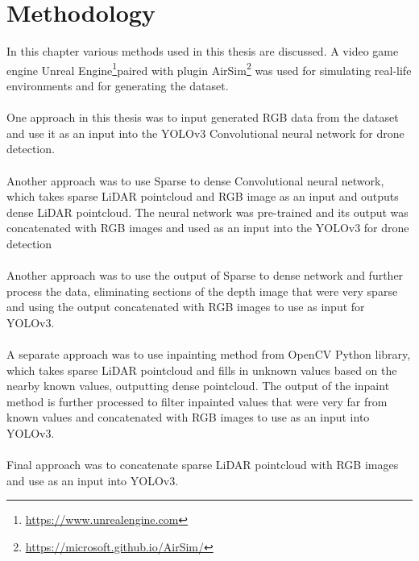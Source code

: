 \documentclass[twoside]{ctuthesis}
\theoremstyle{plain}
\theoremstyle{definition}
\theoremstyle{note}
\begin{document}
\chapter{Methodology}
In this chapter various methods used in this thesis are discussed. A video game engine Unreal Engine\footnote{\url{https://www.unrealengine.com}}paired with plugin AirSim\footnote{\url{https://microsoft.github.io/AirSim/}} was used for simulating real-life environments and for generating the dataset.\\
\\
One approach in this thesis was to input generated RGB data from the dataset and use it as an input into the YOLOv3 Convolutional neural network for drone detection.\\
\\
Another approach was to use Sparse to dense Convolutional neural network, which takes sparse LiDAR pointcloud and RGB image as an input and outputs dense LiDAR pointcloud. The neural network was pre-trained and its output was concatenated with RGB images and used as an input into the YOLOv3  for drone detection\\
\\
Another approach was to use the output of Sparse to dense network and further process the data, eliminating sections of the depth image that were very sparse and using the output concatenated with RGB images to use as input for YOLOv3.\\
\\
A separate approach was to use inpainting method from OpenCV Python library, which takes sparse LiDAR pointcloud and fills in unknown values based on the nearby known values, outputting dense pointcloud. The output of the inpaint method is further processed to filter inpainted values that were very far from known values and concatenated with RGB images to use as an input into YOLOv3.\\
\\
Final approach was to concatenate sparse LiDAR pointcloud with RGB images and use as an input into YOLOv3.
\end{document}
